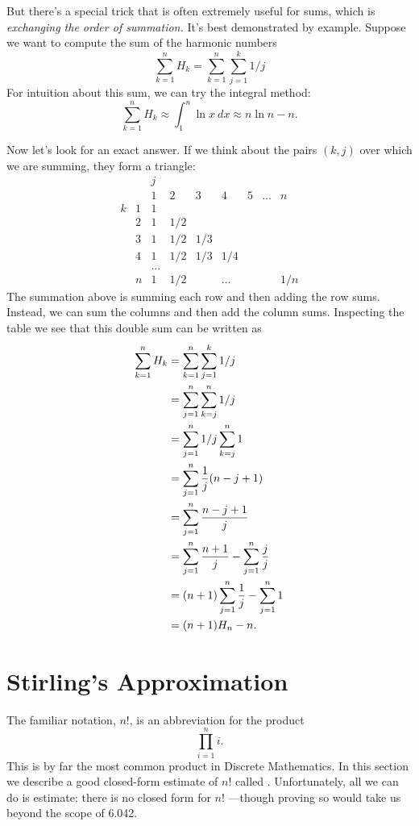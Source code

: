 But there's a special trick that is often extremely useful for sums,
which is \emph{exchanging the order of summation.}  It's best
demonstrated by example.  Suppose we want to compute the sum of the
harmonic numbers
\[
\sum_{k=1}^n H_k = \sum_{k=1}^n \sum_{j=1}^k 1/j
\]
For intuition about this sum, we can try the integral method:
\[
\sum_{k=1}^n H_k \approx \int_{1}^n \ln x \ dx \approx n\ln n-n.
\]

Now let's look for an exact answer.  If we think about the pairs
$(k,j)$ over which we are summing, they form a triangle:
\[
\begin{array}{cc|ccccccc}
 &  & j &   &   &   &   &       &   \\
 &  & 1 & 2 & 3 & 4 & 5 & \dots & n \\
\hline
k & 1 & 1\\
  & 2 &1&1/2\\
  & 3 &1&1/2&1/3\\
  & 4 &1&1/2&1/3&1/4\\
  &   &\dots\\
  & n &1&1/2&&\dots&&&1/n
\end{array}
\]
The summation above is summing each row and then adding the row sums.
Instead, we can sum the columns and then add the column sums.
Inspecting the table we see that this double sum can be written as
\begin{align}
\sum_{k=1}^n H_k &= \sum_{k=1}^n \sum_{j=1}^k 1/j\notag\\
&= \sum_{j=1}^n \sum_{k=j}^n 1/j\notag\\
&= \sum_{j=1}^n 1/j \sum_{k=j}^n 1\notag\\
&= \sum_{j=1}^n \frac1j (n-j+1)\notag\\
&= \sum_{j=1}^n \frac{n-j+1}j \notag\\
&= \sum_{j=1}^n \frac{n+1}j - \sum_{j=1}^n \frac{j}{j}\notag\\
&= (n+1)\sum_{j=1}^n \frac1j - \sum_{j=1}^n 1\notag\\
&= (n+1)H_n-n.\label{sHk}
\end{align}

\section{Stirling's Approximation}\label{Stirling_sec}

The familiar  notation, $n!$, is an abbreviation for the
product
\[
\prod_{i=1}^n i.
\]
This is by far the most common product in Discrete Mathematics.  In this
section we describe a good closed-form estimate of $n!$ called
.  Unfortunately, all we can do is
estimate: there is no closed form for $n!$ ---though proving so would take
us beyond the scope of 6.042.

